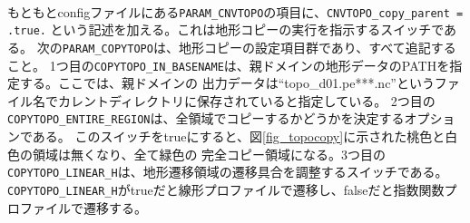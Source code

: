 \\

\noindent もともとconfigファイルにある\verb|PARAM_CNVTOPO|の項目に、\verb|CNVTOPO_copy_parent = .true.|
という記述を加える。これは地形コピーの実行を指示するスイッチである。
次の\verb|PARAM_COPYTOPO|は、地形コピーの設定項目群であり、すべて追記すること。
1つ目の\verb|COPYTOPO_IN_BASENAME|は、親ドメインの地形データのPATHを指定する。ここでは、親ドメインの
出力データは``topo\_d01.pe***.nc''というファイル名でカレントディレクトリに保存されていると指定している。
2つ目の\verb|COPYTOPO_ENTIRE_REGION|は、全領域でコピーするかどうかを決定するオプションである。
このスイッチをtrueにすると、図\ref{fig_topocopy}に示された桃色と白色の領域は無くなり、全て緑色の
完全コピー領域になる。3つ目の\verb|COPYTOPO_LINEAR_H|は、地形遷移領域の遷移具合を調整するスイッチである。
\verb|COPYTOPO_LINEAR_H|がtrueだと線形プロファイルで遷移し、falseだと指数関数プロファイルで遷移する。

